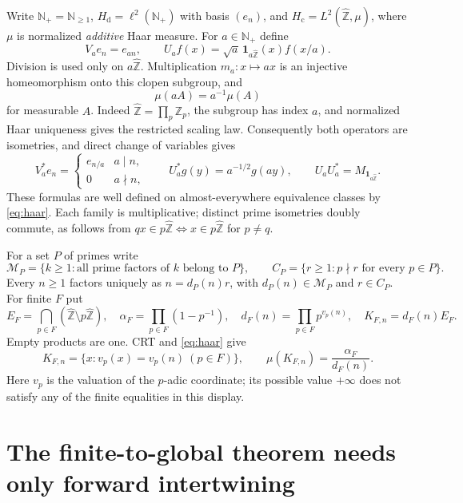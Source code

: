 \documentclass[11pt]{article}
\theoremstyle{remark}
\newcommand{\N}{\mathbb N}
\newcommand{\Zhat}{\widehat{\mathbb Z}}
\newcommand{\Hd}{H_{\mathrm d}}
\newcommand{\Hc}{H_{\mathrm c}}
\newcommand{\one}{\mathbf 1}
\begin{document}
Write $\N_+=\N_{\geq1}$, $\Hd=\ell^2(\N_+)$ with basis $(e_n)$, and
$\Hc=L^2(\Zhat,\mu)$, where $\mu$ is normalized \emph{additive} Haar measure.
For $a\in\N_+$ define
\[
 V_ae_n=e_{an},\qquad
 U_af(x)=\sqrt a\,\one_{a\Zhat}(x)f(x/a).
\]
Division is used only on $a\Zhat$.  Multiplication $m_a:x\mapsto ax$
is an injective homeomorphism onto this clopen subgroup, and
\begin{equation}\label{eq:haar}
 \mu(aA)=a^{-1}\mu(A)
\end{equation}
for measurable $A$.  Indeed $\Zhat=\prod_p\mathbb Z_p$, the subgroup has
index $a$, and normalized Haar uniqueness gives the restricted scaling law.
Consequently both operators are isometries, and direct change of variables
gives
\begin{equation}\label{eq:adjoints}
 V_a^*e_n=\begin{cases}e_{n/a}&a\mid n,\\0&a\nmid n,\end{cases}
 \qquad U_a^*g(y)=a^{-1/2}g(ay),\qquad
 U_aU_a^*=M_{\one_{a\Zhat}}.
\end{equation}
These formulas are well defined on almost-everywhere equivalence classes
by \eqref{eq:haar}.  Each family is multiplicative; distinct prime
isometries doubly commute, as follows from
$qx\in p\Zhat\iff x\in p\Zhat$ for $p\ne q$.

For a set $P$ of primes write
\[
 \mathcal M_P=\{k\geq1:\text{all prime factors of }k\text{ belong to }P\},
 \qquad C_P=\{r\geq1:p\nmid r\text{ for every }p\in P\}.
\]
Every $n\geq1$ factors uniquely as $n=d_P(n)r$, with
$d_P(n)\in\mathcal M_P$ and $r\in C_P$.  For finite $F$ put
\[
 E_F=\bigcap_{p\in F}(\Zhat\setminus p\Zhat),\quad
 \alpha_F=\prod_{p\in F}(1-p^{-1}),\quad
 d_F(n)=\prod_{p\in F}p^{v_p(n)},\quad K_{F,n}=d_F(n)E_F .
\]
Empty products are one.  CRT and \eqref{eq:haar} give
\begin{equation}\label{eq:shellmass}
 K_{F,n}=\{x:v_p(x)=v_p(n)\ (p\in F)\},\qquad
 \mu(K_{F,n})=\frac{\alpha_F}{d_F(n)}.
\end{equation}
Here $v_p$ is the valuation of the $p$-adic coordinate; its possible value
$+\infty$ does not satisfy any of the finite equalities in this display.

\section{The finite-to-global theorem needs only forward intertwining}
\end{document}
